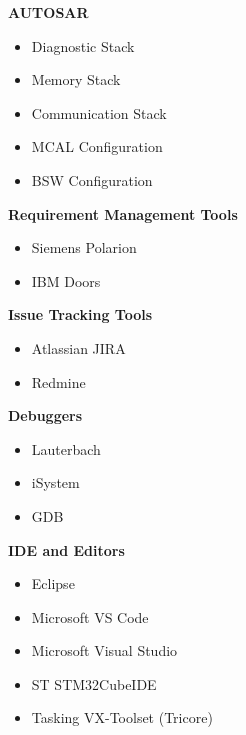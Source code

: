 \begin{minipage}[t]{0.48\textwidth}
\vspace{0.5em}

\textbf{AUTOSAR}
\begin{itemize}[leftmargin=*,noitemsep,topsep=0pt]
    \item Diagnostic Stack 
    \item Memory Stack 
    \item Communication Stack 
    \item MCAL Configuration 
    \item BSW Configuration 
\end{itemize}

\vspace{0.5em}

\textbf{Requirement Management Tools}
\begin{itemize}[leftmargin=*,noitemsep,topsep=0pt]
    \item Siemens Polarion 
    \item IBM Doors 
\end{itemize}

\vspace{0.5em}

\textbf{Issue Tracking Tools}
\begin{itemize}[leftmargin=*,noitemsep,topsep=0pt]
    \item Atlassian JIRA 
    \item Redmine 
\end{itemize}

\vspace{0.5em}

\textbf{Debuggers}
\begin{itemize}[leftmargin=*,noitemsep,topsep=0pt]
    \item Lauterbach 
    \item iSystem 
    \item GDB 
\end{itemize}

\vspace{0.5em}

\textbf{IDE and Editors}
\begin{itemize}[leftmargin=*,noitemsep,topsep=0pt]
    \item Eclipse 
    \item Microsoft VS Code 
    \item Microsoft Visual Studio 
    \item ST STM32CubeIDE 
    \item Tasking VX-Toolset (Tricore) 
\end{itemize}
\end{minipage}
